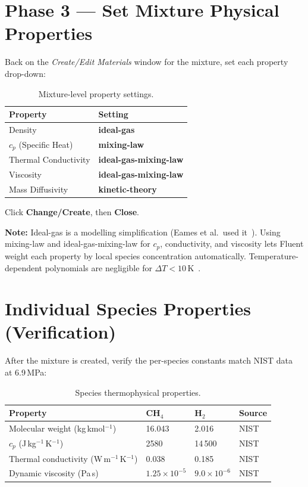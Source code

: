 \documentclass[12pt,a4paper]{report}
\begin{document}
\section{Phase 3 --- Set Mixture Physical Properties}

Back on the \textit{Create/Edit Materials} window for the mixture,
set each property drop-down:

\begin{table}[H]
\centering
\caption{Mixture-level property settings.}
\label{tab:mixprops}
\begin{tabular}{@{}ll@{}}
\toprule
\textbf{Property} & \textbf{Setting} \\
\midrule
Density              & \textbf{ideal-gas} \\
$c_p$ (Specific Heat)& \textbf{mixing-law} \\
Thermal Conductivity & \textbf{ideal-gas-mixing-law} \\
Viscosity            & \textbf{ideal-gas-mixing-law} \\
Mass Diffusivity     & \textbf{kinetic-theory} \\
\bottomrule
\end{tabular}
\end{table}

\noindent Click \textbf{Change/Create}, then \textbf{Close}.

\medskip
\noindent\textbf{Note:} Ideal-gas is a modelling simplification
(Eames et al.\ used it~\cite{Eames2022}).  Using mixing-law and
ideal-gas-mixing-law for $c_p$, conductivity, and viscosity lets
Fluent weight each property by local species concentration
automatically.  Temperature-dependent polynomials are negligible for
$\Delta T < 10$\,K~\cite{Poling2001}.

\section{Individual Species Properties (Verification)}

After the mixture is created, verify the per-species constants match
NIST data~\cite{NIST2023} at 6.9\,MPa:

\begin{table}[H]
\centering
\caption{Species thermophysical properties.}
\label{tab:matprops}
\begin{tabular}{@{}llll@{}}
\toprule
\textbf{Property} & \textbf{CH$_4$} & \textbf{H$_2$} & \textbf{Source} \\
\midrule
Molecular weight (kg\,kmol$^{-1}$) & 16.043 & 2.016 & NIST \\
$c_p$ (J\,kg$^{-1}$\,K$^{-1}$)    & 2580 & 14\,500 & NIST \\
Thermal conductivity (W\,m$^{-1}$\,K$^{-1}$) & 0.038 & 0.185 & NIST \\
Dynamic viscosity (Pa\,s)           & $1.25 \times 10^{-5}$ & $9.0 \times 10^{-6}$ & NIST \\
\bottomrule
\end{tabular}
\end{table}
\end{document}
